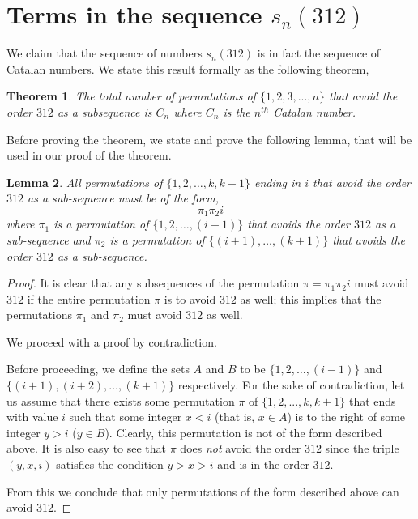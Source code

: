 \documentclass[11pt,letterpaper,twoside,english]{article}
\theoremstyle{theorem}
\newtheorem{theorem}{Theorem}
\newtheorem{lemma}[theorem]{Lemma}
\theoremstyle{remark}
\begin{document}
\section{Terms in the sequence $s_n(312)$}
\label{S3}




We claim that the sequence of numbers $s_n(312)$ is in fact the sequence of Catalan numbers. We state this result formally as the following theorem,

\begin{theorem}
The total number of permutations of $\{1,2,3,...,n\}$ that avoid the order $312$ as a subsequence is $C_n$ where $C_n$ is the $n^{th}$ Catalan number.
\end{theorem}

Before proving the theorem, we state and prove the following lemma, that will be used in our proof of the theorem.
\begin{lemma}
All permutations of $\{1,2,\dots,k,k+1\}$ ending in $i$ that avoid the order $312$ as a sub-sequence must be of the form,
$$\pi_1 \pi_2 i$$
where $\pi_1$ is a permutation of $\{1,2,\ldots,(i-1)\}$ that avoids the order $312$ as a sub-sequence and $\pi_2$ is a permutation of $\{(i+1),\ldots,(k+1)\}$ that avoids the order $312$ as a sub-sequence.
\end{lemma}

\begin{proof}
It is clear that any subsequences of the permutation $\pi = \pi_1 \pi_2 i$ must avoid $312$ if the entire permutation $\pi$ is to avoid $312$ as well; this implies that the permutations $\pi_1$ and $\pi_2$ must avoid $312$ as well.

We proceed with a proof by contradiction.

Before proceeding, we define the sets $A$ and $B$ to be $\{1,2,\ldots,(i-1)\}$ and $\{(i+1),(i+2),\ldots,(k+1)\}$ respectively. For the sake of contradiction, let us assume that there exists some permutation $\pi$ of $\{1,2,...,k,k+1\}$ that ends with value $i$ such that some integer $x < i$ (that is, $x \in A$) is to the right of some integer $y > i$ ($y \in B$). Clearly, this permutation is not of the form described above. It is also easy to see that $\pi$ does \emph{not} avoid the order $312$ since the triple $(y, x, i)$ satisfies the condition $y > x > i$ and is in the order $312$.

From this we conclude that only permutations of the form described above can avoid $312$.

\end{proof}
\end{document}
